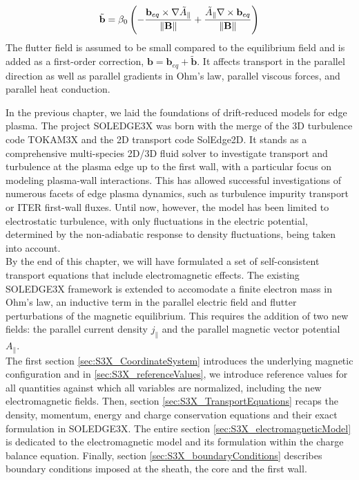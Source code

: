 \begin{chaptersummarybox}
	\begin{equation*}
		\tilde{\mathbf{b}} = \beta_0 \left(- \frac{\mathbf{b}_{eq} \times \nabla \tilde{A}_\parallel}{\norm{\mathbf{B}}} + \frac{\tilde{A}_\parallel \nabla \times \mathbf{b}_{eq}}{\norm{\mathbf{B}}}\right)
	\end{equation*}
	The flutter field is assumed to be small compared to the equilibrium field and is added as a first-order correction, $\textbf{b} = \textbf{b}_{eq} + \tilde{\textbf{b}}$. It affects transport in the parallel direction as well as parallel gradients in Ohm's law, parallel viscous forces, and parallel heat conduction.
\end{chaptersummarybox}
\vfill
\newpage


In the previous chapter, we laid the foundations of drift-reduced models for edge plasma. The project SOLEDGE3X was born with the merge of the 3D turbulence code TOKAM3X\cite{tamain2016tokam3x} and the 2D transport code SolEdge2D\cite{Bufferand_2015}. It stands as a comprehensive multi-species 2D/3D fluid solver to investigate transport and turbulence at the plasma edge up to the first wall, with a particular focus on modeling plasma-wall interactions. This has allowed successful investigations of numerous facets of edge plasma dynamics, such as turbulence\cite{Bufferand_2021} impurity transport\cite{Ciraolo2021} or ITER first-wall fluxes\cite{Rivals2022}. Until now, however, the model has been limited to electrostatic turbulence, with only fluctuations in the electric potential, determined by the non-adiabatic response to density fluctuations, being taken into account. \\

By the end of this chapter, we will have formulated a set of self-consistent transport equations that include electromagnetic effects. The existing SOLEDGE3X framework is extended to accomodate a finite electron mass in Ohm's law, an inductive term in the parallel electric field and flutter perturbations of the magnetic equilibrium. This requires the addition of two new fields: the parallel current density $j_\parallel$ and the parallel magnetic vector potential $A_\parallel$. \\

The first section \ref{sec:S3X_CoordinateSystem} introduces the underlying magnetic configuration and in \ref{sec:S3X_referenceValues}, we introduce reference values for all quantities against which all variables are normalized, including the new electromagnetic fields. Then, section \ref{sec:S3X_TransportEquations} recaps the density, momentum, energy and charge conservation equations and their exact formulation in SOLEDGE3X. The entire section \ref{sec:S3X_electromagneticModel} is dedicated to the electromagnetic model and its formulation within the charge balance equation. Finally, section \ref{sec:S3X_boundaryConditions} describes boundary conditions imposed at the sheath, the core and the first wall.




